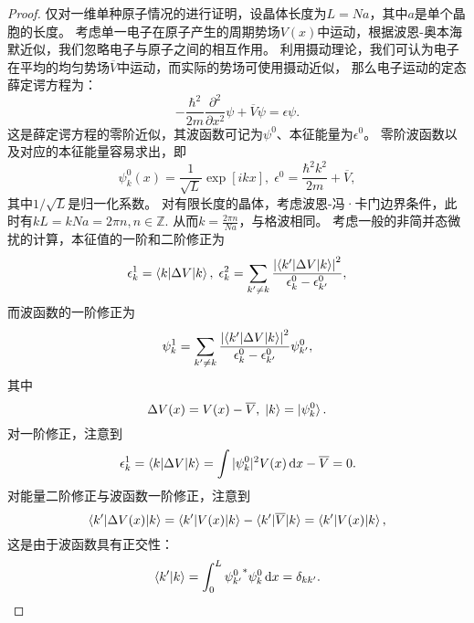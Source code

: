 \begin{proof}
    仅对一维单种原子情况的进行证明，设晶体长度为$L = Na$，其中$a$是单个晶胞的长度。
    考虑单一电子在原子产生的周期势场$V(x)$中运动，根据波恩-奥本海默近似，我们忽略电子与原子之间的相互作用。
    利用摄动理论，我们可认为电子在平均的均匀势场$\overline V$中运动，而实际的势场可使用摄动近似，
    那么电子运动的定态薛定谔方程为：
    \begin{equation}
        - \frac{\hbar^2}{2m} \frac{\partial^2}{\partial x^2} \psi + \overline V \psi = \epsilon \psi.
    \end{equation}
    这是薛定谔方程的零阶近似，其波函数可记为$\psi^0$、本征能量为$\epsilon^0$。
    零阶波函数以及对应的本征能量容易求出，即
    \begin{equation}
        \psi^0_k (x) = \frac{1}{\sqrt L} \exp[ikx], \; \epsilon^0 = \frac{\hbar^2 k^2}{2m} + \overline V,
    \end{equation}
    其中$1/\sqrt L$是归一化系数。
    对有限长度的晶体，考虑波恩-冯·卡门边界条件，此时有$k L = k N a = 2 \pi n, n \in \mathbb Z$.
    从而$k = \frac{2\pi n}{Na}$，与格波相同。
    考虑一般的非简并态微扰的计算，本征值的一阶和二阶修正为
    \begin{equation}
        \epsilon_k^1 = \braket{k|\Delta V|k}, \; \epsilon_k^2 = \sum_{k' \neq k} \frac{\left\vert \braket{k'|\Delta V|k} \right\vert^2}{\epsilon_k^0 - \epsilon_{k'}^0},
    \end{equation}
    而波函数的一阶修正为
    \begin{equation}
        \psi^1_k = \sum_{k' \neq k} \frac{\left\vert \braket{k'|\Delta V|k} \right\vert^2}{\epsilon_k^0 - \epsilon_{k'}^0} \psi_{k'}^0,
    \end{equation}
    其中
    \begin{equation}
        \Delta V(x) = V(x) - \overline V, \; \ket{k} = \ket{\psi_k^0}.
    \end{equation}
    对一阶修正，注意到
    \begin{equation}
        \epsilon_k^1 = \braket{k|\Delta V|k} = \int |\psi_k^0|^2 V(x) \, \mathrm d x - \overline V = 0.
    \end{equation}
    对能量二阶修正与波函数一阶修正，注意到
    \begin{equation}
        \braket{k'|\Delta V(x)|k} = \braket{k'|V(x)|k} - \braket{k'|\overline V|k} = \braket{k'|V(x)|k},
    \end{equation}
    这是由于波函数具有正交性：
    \begin{equation}
        \braket{k'|k} = \int_0^L {\psi_{k'}^0}^* \psi_k^0 \, \mathrm d x = \delta_{kk'}.

\end{equation}
\end{proof}
